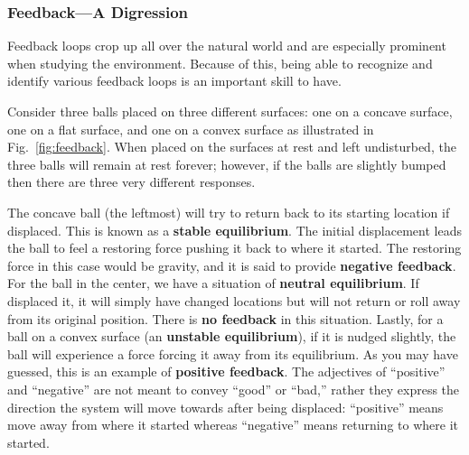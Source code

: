     \subsubsection{Feedback---A Digression} %
    \label{ssub:feedback}
    Feedback loops crop up all over the natural world and are especially prominent when studying the environment. Because of this, being able to recognize and identify various feedback loops is an important skill to have.
    
    Consider three balls placed on three different surfaces: one on a concave surface, one on a flat surface, and one on a convex surface as illustrated in Fig.~\ref{fig:feedback}. When placed on the surfaces at rest and left undisturbed, the three balls will remain at rest forever; however, if the balls are slightly bumped then there are three very different responses. 

    The concave ball (the leftmost) will try to return back to its starting location if displaced. This is known as a \textbf{stable equilibrium}. The initial displacement leads the ball to feel a restoring force pushing it back to where it started. The restoring force in this case would be gravity, and it is said to provide \textbf{negative feedback}. For the ball in the center, we have a situation of \textbf{neutral equilibrium}. If displaced it, it will simply have changed locations but will not return or roll away from its original position. There is \textbf{no feedback} in this situation. Lastly, for a ball on a convex surface (an \textbf{unstable equilibrium}), if it is nudged slightly, the ball will experience a force forcing it away from its equilibrium. As you may have guessed, this is an example of \textbf{positive feedback}. The adjectives of ``positive'' and ``negative'' are not meant to convey ``good'' or ``bad,'' rather they express the direction the system will move towards after being displaced: ``positive'' means move away from where it started whereas ``negative'' means returning to where it started.

